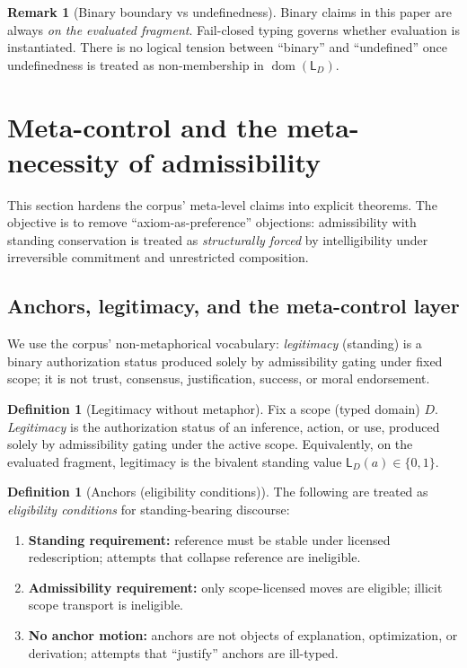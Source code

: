 \documentclass[11pt]{article}
\theoremstyle{definition}
\newtheorem{definition}[theorem]{Definition}
\newtheorem{remark}[theorem]{Remark}
\newcommand{\Stand}{\mathsf{L}}
\newcommand{\pdom}{\operatorname{dom}}
\begin{document}
\begin{remark}[Binary boundary vs undefinedness]
Binary claims in this paper are always \emph{on the evaluated fragment}. Fail-closed typing governs whether evaluation is instantiated.
There is no logical tension between ``binary'' and ``undefined'' once undefinedness is treated as non-membership in $\pdom(\Stand_D)$.
\end{remark}



\section{Meta-control and the meta-necessity of admissibility}
\label{sec:meta}

This section hardens the corpus' meta-level claims into explicit theorems.
The objective is to remove ``axiom-as-preference'' objections: admissibility with standing conservation is treated as \emph{structurally forced} by intelligibility under irreversible commitment and unrestricted composition.

\subsection{Anchors, legitimacy, and the meta-control layer}

We use the corpus' non-metaphorical vocabulary:
\emph{legitimacy} (standing) is a binary authorization status produced solely by admissibility gating under fixed scope; it is not trust, consensus, justification, success, or moral endorsement.

\begin{definition}[Legitimacy without metaphor]
Fix a scope (typed domain) $D$.
\emph{Legitimacy} is the authorization status of an inference, action, or use, produced solely by admissibility gating under the active scope.
Equivalently, on the evaluated fragment, legitimacy is the bivalent standing value $\Stand_D(a)\in\{0,1\}$.
\end{definition}

\begin{definition}[Anchors (eligibility conditions)]
The following are treated as \emph{eligibility conditions} for standing-bearing discourse:
\begin{enumerate}[label=\textbf{A\arabic*}, leftmargin=2.2em]
\item \textbf{Standing requirement:} reference must be stable under licensed redescription; attempts that collapse reference are ineligible.
\item \textbf{Admissibility requirement:} only scope-licensed moves are eligible; illicit scope transport is ineligible.
\item \textbf{No anchor motion:} anchors are not objects of explanation, optimization, or derivation; attempts that ``justify'' anchors are ill-typed.
\end{enumerate}
\end{definition}
\end{document}
